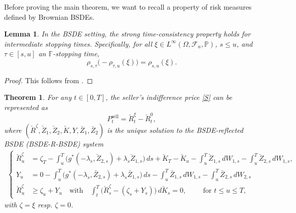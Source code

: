 \documentclass{article}
\newtheorem{lemma}[definition]{Lemma}
\newtheorem{theorem}[definition]{Theorem}
\begin{document}
Before proving the main theorem, we want to recall a property of risk measures defined by Brownian BSDEs.

\begin{lemma}\label{lem:stc}
	In the BSDE setting, the strong time-consistency property holds for intermediate stopping times. Specifically, for all
	$\xi \in L^\infty(\Omega,\mathcal{F}_u, \mathbb{P})$, $s \leq u$, and $\tau \in [s,u]$ an $\mathbb{F}$-stopping time,
	\[
		\rho_{s,\tau} \bigl( -\rho_{\tau,u} (\xi)\bigr) = \rho_{s,u} (\xi).
	\]
\end{lemma}

\begin{proof}
	This follows from \cite[Theorem 3.21]{BEK09}.
\end{proof}

\begin{theorem}\label{thm:sellprice}
	For any $t\in[0,T]$, the seller's indifference price \eqref{S} can be represented as 
	\[
		P_t^{\text{sell}} = \check{R}^{\xi}_t - \check{R}^0_t,
	\]
	where $(\check{R}^\zeta, \check{Z}_1, \check{Z}_2, \check{K}, Y, \bar{Z}_1, \bar{Z}_2)$ is the unique solution to the BSDE-reflected BSDE (BSDE-R-BSDE) system
	\begin{align*}
		\left\{\begin{array}{ll}\check{R}^\zeta_u &= \zeta_T -\int_u^T \bigl(g^*(-\lambda_s, \check{Z}_{2,s}) + \lambda_s\check{Z}_{1,s}  \bigr) \, ds+
		\check{K}_T-\check{K}_u  -\int_u^T\check{Z}_{1,s} \, dW_{1,s} -\int_u^T\check{Z}_{2,s} \, dW_{1,s},\\
		Y_u &= 0 -\int_u^T \bigl( g^*(-\lambda_s, \bar{Z}_{2,s}) + \lambda_s\bar{Z}_{1,s}\bigr) \, ds  -\int_u^T\bar{Z}_{1,s} \, dW_{1,s} -\int_u^T\bar{Z}_{2,s} \, 
		dW_{2,s}\\
		\check{R}^\zeta_u &\geq  \zeta_u + Y_u \quad \text{with} \quad \int_t^T \bigl(\check{R}^\zeta_s - (\zeta_s+Y_s)\bigr) \, d\check{K}_s = 0, \qquad \text{ for }t\leq u\leq T,
		\end{array} \right.
	\end{align*}
	with $\zeta =\xi$ resp. $\zeta = 0$.
\end{theorem}
\end{document}
